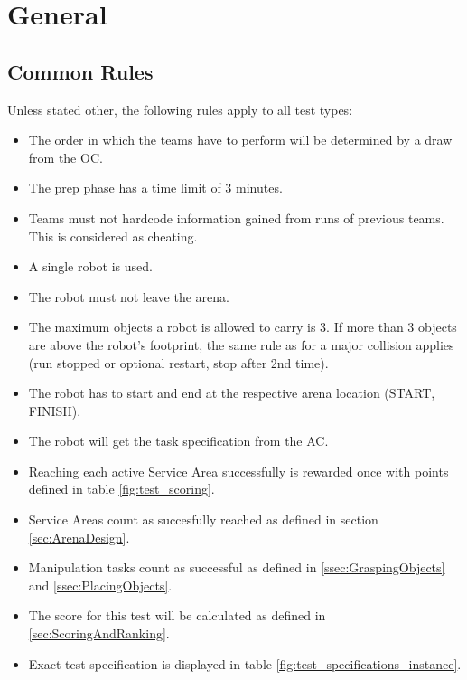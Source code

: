 \label{sec:Tests}

\section{General}

\subsection{Common Rules}
\label{ssec: Common Rules}


Unless stated other, the following rules apply to all test types:

\begin{itemize}
\item The order in which the teams have to perform will be determined by a draw from the OC.
\item The prep phase has a time limit of 3 minutes.
\item Teams must not hardcode information gained from runs of previous teams. This is considered as cheating.
\item A single robot is used.
\item The robot must not leave the arena.
\item The maximum objects a robot is allowed to carry is 3. If more than 3 objects are above the robot's footprint, the same rule as for a major collision applies (run stopped or optional restart, stop after 2nd time). 
\item The robot has to start and end at the respective arena location (START, FINISH).
\item The robot will get the task specification from the AC.
\item Reaching each active Service Area successfully is rewarded once with points defined in table \ref{fig:test_scoring}.
\item Service Areas count as succesfully reached as defined in section \ref{sec:ArenaDesign}.
\item Manipulation tasks count as successful as defined in \ref{ssec:GraspingObjects} and \ref{ssec:PlacingObjects}.
\item The score for this test will be calculated as defined in \ref{sec:ScoringAndRanking}.
\item Exact test specification is displayed in table \ref{fig:test_specifications_instance}.
\end{itemize}





